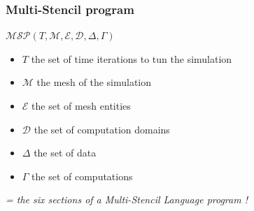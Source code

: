 \documentclass{beamer}
\begin{document}


\begin{frame}
\frametitle{Multi-Stencil program}
\begin{center}
$\mathcal{MSP}(T,\mathcal{M},\mathcal{E},\mathcal{D},\Delta,\Gamma)$
\end{center}
\begin{itemize}
\item $T$ the set of time iterations to tun the simulation
\item $\mathcal{M}$ the mesh of the simulation
\item $\mathcal{E}$ the set of mesh entities
\item $\mathcal{D}$ the set of computation domains
\item $\Delta$ the set of data
\item $\Gamma$ the set of computations
\end{itemize}
\center \textit{= the six sections of a \emph{Multi-Stencil Language} program !}
\end{frame}
\end{document}
